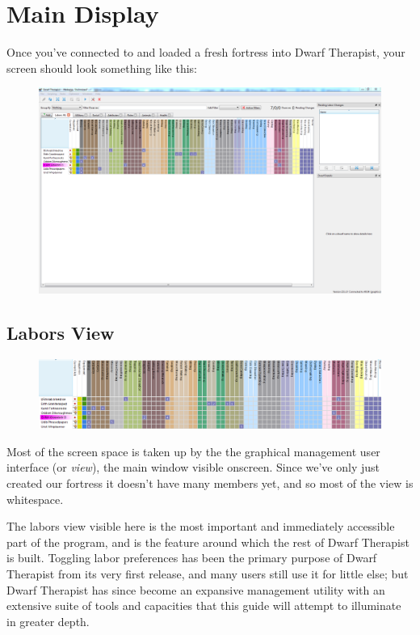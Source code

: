 \documentclass[]{article}
\begin{document}
\section{Main Display}
\label{sec:Main Display}
Once you've connected to and loaded a fresh fortress into Dwarf Therapist, your screen should look
something like this:
\begin{figure}[h!] \centering \includegraphics[width=\linewidth]{Sec1Fig4}
\end{figure}

\subsection{Labors View}
\label{sec:Labors View}
\begin{figure}[h!] \centering \includegraphics[width=\linewidth]{Sec1Fig5}
\end{figure}
Most of the screen space is taken up by the the graphical management user interface
(or \emph{view}), the main window visible onscreen. Since we've only just created our fortress it doesn't
have many members yet, and so most of the view is whitespace.

The labors view visible here is the most important and immediately accessible part of the program,
and is the feature around which the rest of Dwarf Therapist is built. Toggling labor preferences has
been the primary purpose of Dwarf Therapist from its very first release, and many users still use it for
little else; but Dwarf Therapist has since become an expansive management utility with an
extensive suite of tools and capacities that this guide will attempt to illuminate in greater depth.
\end{document}
